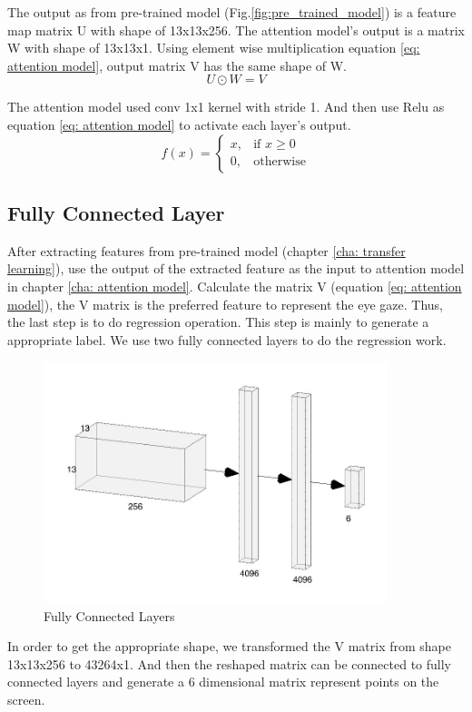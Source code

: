 \documentclass[senior]{IPSstyle}
\begin{document}
The output as from pre-trained model (Fig.\ref{fig:pre_trained_model}) is a feature map matrix U with shape of 13x13x256.
The attention model's output is a matrix W with shape of 13x13x1.
Using element wise multiplication equation \ref{eq: attention model}, output matrix V has the same shape of W.
\begin{equation}\label{eq: attention model}
U \odot W = V
\end{equation}

The attention model used conv 1x1 kernel with stride 1.
And then use Relu as equation \ref{eq: attention model} to activate each layer's output.
\begin{equation}\label{eq:relu}
    f(x)= 
\begin{cases}
    x,& \text{if } x\geq 0\\
    0,              & \text{otherwise}
\end{cases}
\end{equation}

\subsection{Fully Connected Layer}\label{cha: fcn}
After extracting features from pre-trained model (chapter \ref{cha: transfer learning}), use the output of the extracted feature as the input to attention model in chapter \ref{cha: attention model}.
Calculate the matrix V (equation \ref{eq: attention model}), the V matrix is the preferred feature to represent the eye gaze.
Thus, the last step is to do regression operation.
This step is mainly to generate a appropriate label.
We use two fully connected layers to do the regression work.
\begin{figure}
    \centering
    \includegraphics[width=10cm]{MasterThesis-master/images/fcn.jpg}
    \caption{Fully Connected Layers}
    \label{fig:fcn}
\end{figure}
In order to get the appropriate shape, we transformed the V matrix from shape 13x13x256 to 43264x1.
And then the reshaped matrix can be connected to fully connected layers and generate a 6 dimensional matrix represent points on the screen.
\end{document}
